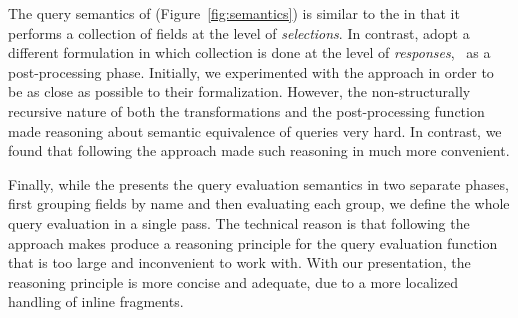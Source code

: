 The query semantics of \gcoql (Figure~\ref{fig:semantics}) is similar to the \spec in that it performs a collection of fields at the level of {\em selections}. In contrast, \HP adopt a different formulation in which collection is done at the level of {\em responses}, \ie~as a post-processing phase. Initially, we experimented with the \HP approach in order to be as close as possible to their formalization. However, the non-structurally recursive nature of both the transformations and the post-processing function made reasoning about semantic equivalence of queries very hard. In contrast, we found that following the \spec approach made such reasoning in \coq much more convenient. 

Finally, while the \spec presents the query evaluation semantics in two separate phases, first grouping fields by name and then evaluating each group, we define the whole query evaluation in a single pass. The technical reason is that following the \spec approach makes \equations produce a reasoning principle for the query evaluation function that is too large and inconvenient to work with. With our presentation, the reasoning principle is more concise and adequate, due to a more localized handling of inline fragments.





